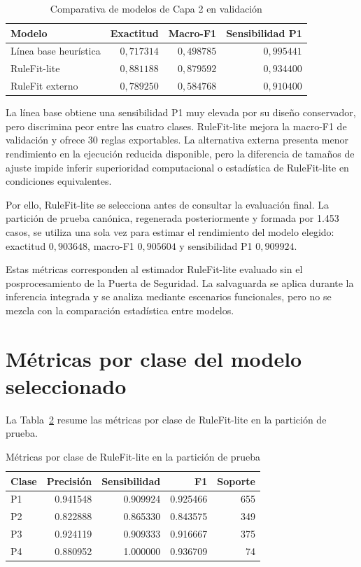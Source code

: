 \begin{table}[ht]
\centering
\caption{Comparativa de modelos de Capa 2 en validación}
\label{tab:9-comparativa}
\small
\begin{tabular}{|l|r|r|r|}
\hline
\textbf{Modelo} & \textbf{Exactitud} & \textbf{Macro-F1} & \textbf{Sensibilidad P1} \\ \hline
Línea base heurística & \(0{,}717314\) & \(0{,}498785\) & \(0{,}995441\) \\ \hline
RuleFit-lite & \(0{,}881188\) & \(0{,}879592\) & \(0{,}934400\) \\ \hline
RuleFit externo & \(0{,}789250\) & \(0{,}584768\) & \(0{,}910400\) \\ \hline
\end{tabular}
\end{table}

La línea base obtiene una sensibilidad P1 muy elevada por su diseño conservador, pero discrimina
peor entre las cuatro clases. RuleFit-lite mejora la macro-F1 de validación y ofrece
30 reglas exportables. La alternativa externa presenta menor rendimiento en la ejecución
reducida disponible, pero la diferencia de tamaños de ajuste impide inferir superioridad
computacional o estadística de RuleFit-lite en condiciones equivalentes.

Por ello, RuleFit-lite se selecciona antes de consultar la evaluación final. La
partición de prueba canónica, regenerada posteriormente y formada por 1.453 casos, se
utiliza una sola vez para estimar el rendimiento del modelo elegido: exactitud
\(0{,}903648\), macro-F1 \(0{,}905604\) y sensibilidad P1 \(0{,}909924\).

Estas métricas corresponden al estimador RuleFit-lite evaluado sin el posprocesamiento
de la Puerta de Seguridad. La salvaguarda se aplica durante la inferencia integrada y se
analiza mediante escenarios funcionales, pero no se mezcla con la comparación estadística
entre modelos.

\section{Métricas por clase del modelo seleccionado}

La Tabla~\ref{tab:9-rulefit-lite-clases} resume las métricas por clase de RuleFit-lite
en la partición de prueba.

\begin{table}[ht]
\centering
\caption{Métricas por clase de RuleFit-lite en la partición de prueba}
\label{tab:9-rulefit-lite-clases}
\small
\begin{tabular}{|l|r|r|r|r|}
\hline
\textbf{Clase} & \textbf{Precisión} & \textbf{Sensibilidad} & \textbf{F1} & \textbf{Soporte} \\ \hline
P1 & 0.941548 & 0.909924 & 0.925466 & 655 \\ \hline
P2 & 0.822888 & 0.865330 & 0.843575 & 349 \\ \hline
P3 & 0.924119 & 0.909333 & 0.916667 & 375 \\ \hline
P4 & 0.880952 & 1.000000 & 0.936709 & 74 \\ \hline
\end{tabular}
\end{table}

